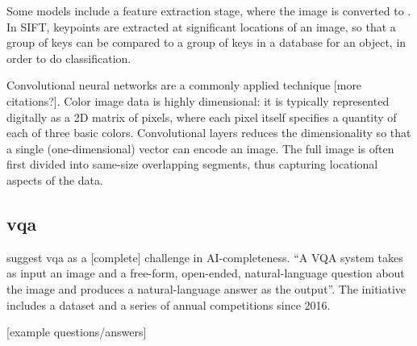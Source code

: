 Some models include a feature extraction stage, where the image is converted to .
In SIFT, keypoints are extracted at significant locations of an image, so that a group of keys can be compared to a group of keys in a database for an object, in order to do classification.

Convolutional neural networks are a commonly applied technique \citep{HeDeepResidualLearning2015} [more citations?].
Color image data is highly dimensional: it is typically represented digitally as a 2D matrix of pixels, where each pixel itself specifies a quantity of each of three basic colors.
Convolutional layers reduces the dimensionality so that a single (one-dimensional) vector can encode an image.
The full image is often first divided into same-size overlapping segments, thus capturing locational aspects of the data.





\subsection{\Acrfull{vqa}}

\cite{AgrawalVQAVisualQuestion2015} suggest \acrfull{vqa} as a [complete] challenge in AI-completeness.
``A VQA system takes as input an image and a free-form, open-ended, natural-language question about the image and produces a natural-language answer as the output''.
The initiative includes a dataset and a series of annual competitions since 2016.

\cite{AndreasLearningComposeNeural2016}

\cite{SchlangenResolvingReferencesObjects2015}

[example questions/answers]